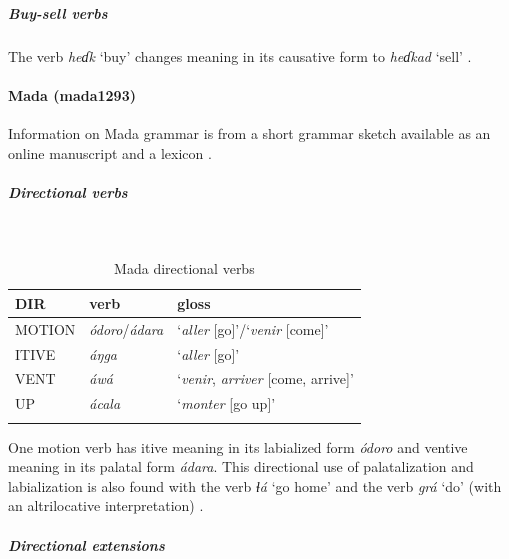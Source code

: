 \subparagraph{Buy-sell verbs}

The verb \textit{heɗk} `buy' changes meaning in its causative form to \textit{heɗkad} `sell' \citep[67]{barreteauDescriptionMofuGudurLangue1983}.

\paragraph*{Mada (mada1293)} \label{mada}

Information on Mada grammar is from a short grammar sketch available as an online manuscript \citep{ernstkurdiTenseAspectMood2016} and a lexicon \citep{barreteau2000dictionnaire}.

\subparagraph{Directional verbs}~

\begin{table}[H]
	\caption{Mada directional verbs} 
	\label{tab:madaV}
	\begin{tabular}{lll} %
		\lsptoprule
		DIR & verb & gloss   \\ %
		\midrule
		MOTION & \textit{ódoro}/\textit{ádara} & `\textit{aller} [go]'/`\textit{venir} [come]' \\ 
		ITIVE & \textit{áŋga} & `\textit{aller} [go]' \\
		VENT & \textit{áwá} & `\textit{venir}, \textit{arriver} [come, arrive]' \\
		UP & \textit{ácala} & `\textit{monter} [go up]' \\
		\lspbottomrule
	\end{tabular}
\end{table}

One motion verb has itive meaning in its labialized form \textit{ódoro} and ventive meaning in its palatal form \textit{ádara}. This directional use of palatalization and labialization is also found with the verb \textit{ɬá} `go home' and the verb \textit{grá} `do' (with an altrilocative interpretation) \citep[29]{ernstkurdiTenseAspectMood2016}.

\largerpage[2]
\subparagraph{Directional extensions}~

